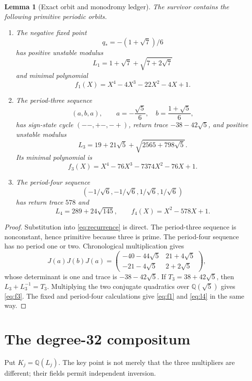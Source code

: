 \documentclass[11pt]{article}
\newtheorem{lemma}[theorem]{Lemma}
\theoremstyle{remark}\newtheorem{remark}[theorem]{Remark}
\begin{document}
\begin{lemma}[Exact orbit and monodromy ledger]\label{lem:orbits}
The survivor contains the following primitive periodic orbits.
\begin{enumerate}
\item The negative fixed point
\[
q_*=-(1+\sqrt7)/6
\]
has positive unstable modulus
\[
L_1=1+\sqrt7+\sqrt{7+2\sqrt7}
\]
and minimal polynomial
\begin{equation}\label{eq:f1}
f_1(X)=X^4-4X^3-22X^2-4X+1.
\end{equation}
\item The period-three sequence
\[
(a,b,a),\qquad a=-\frac{\sqrt5}{6},\quad
b=\frac{1+\sqrt5}{6},
\]
has sign-state cycle $(--,+-,-+)$, return trace
$-38-42\sqrt5$, and positive unstable modulus
\[
L_3=19+21\sqrt5+\sqrt{2565+798\sqrt5}.
\]
Its minimal polynomial is
\begin{equation}\label{eq:f3}
f_3(X)=X^4-76X^3-7374X^2-76X+1.
\end{equation}
\item The period-four sequence
\[
(-1/\sqrt6,-1/\sqrt6,1/\sqrt6,1/\sqrt6)
\]
has return trace $578$ and
\begin{equation}\label{eq:l4}
L_4=289+24\sqrt{145},\qquad
f_4(X)=X^2-578X+1.
\end{equation}
\end{enumerate}
\end{lemma}
\begin{proof}
Substitution into \eqref{eq:recurrence} is direct.  The period-three sequence
is nonconstant, hence primitive because three is prime.  The period-four
sequence has no period one or two.  Chronological multiplication gives
\[
J(a)J(b)J(a)=
\begin{pmatrix}
-40-44\sqrt5&21+4\sqrt5\\
-21-4\sqrt5&2+2\sqrt5
\end{pmatrix},
\]
whose determinant is one and trace is $-38-42\sqrt5$.  If
$T_3=38+42\sqrt5$, then $L_3+L_3^{-1}=T_3$.  Multiplying the two conjugate
quadratics over $\mathbb Q(\sqrt5)$ gives \eqref{eq:f3}.  The fixed and
period-four calculations give \eqref{eq:f1} and \eqref{eq:l4} in the same
way.
\end{proof}

\section{The degree-32 compositum}
Put $K_j=\mathbb Q(L_j)$.  The key point is not merely that the three
multipliers are different; their fields permit independent inversion.
\end{document}
